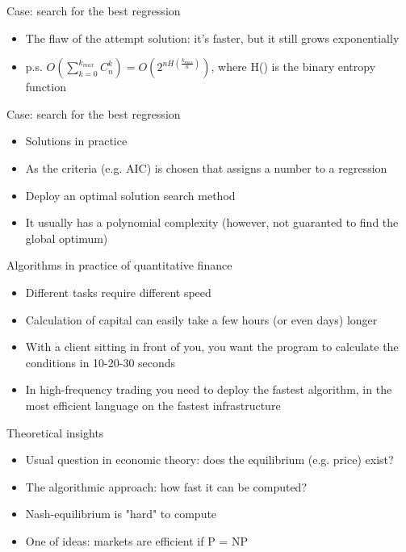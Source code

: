 \documentclass[presentation]{beamer}
\begin{document}
\begin{frame}[label=sec-3-14]{Case: search for the best regression}
\begin{itemize}
\item The flaw of the attempt solution: it's faster, but it still grows exponentially
\item p.s. $O(\sum_{k=0}^{k_{max}} C_n^k) = O(2^{nH(\frac{k_{max}}{n})})$, where H() is the binary entropy function
\end{itemize}
\end{frame}
\begin{frame}[label=sec-3-15]{Case: search for the best regression}
\begin{itemize}
\item Solutions in practice
\item As the criteria (e.g. AIC) is chosen that assigns a number to a regression
\item Deploy an optimal solution search method
\item It usually has a polynomial complexity (however, not guaranted to find the global optimum)
\end{itemize}
\end{frame}
\begin{frame}[label=sec-3-16]{Algorithms in practice of quantitative finance}
\begin{itemize}
\item Different tasks require different speed
\item Calculation of capital can easily take a few hours (or even days) longer
\item With a client sitting in front of you, you want the program to calculate the conditions in 10-20-30 seconds
\item In high-frequency trading you need to deploy the fastest algorithm, in the most efficient language on the fastest infrastructure
\end{itemize}
\end{frame}
\begin{frame}[label=sec-3-17]{Theoretical insights}
\begin{itemize}
\item Usual question in economic theory: does the equilibrium (e.g. price) exist?
\item The algorithmic approach: how fast it can be computed?
\item Nash-equilibrium is "hard" to compute
\item One of ideas: markets are efficient if P = NP
\end{itemize}
\end{frame}
\end{document}
